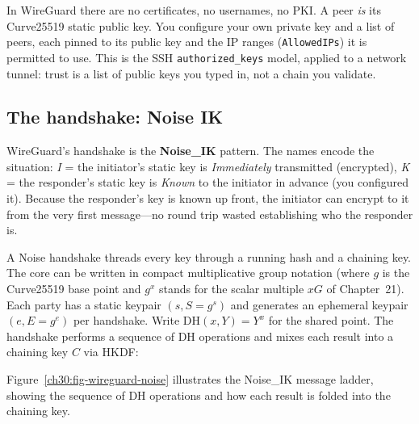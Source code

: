 In WireGuard there are no certificates, no usernames, no PKI. A peer \emph{is} its Curve25519 static public key. You configure your own private key and a list of peers, each pinned to its public key and the IP ranges (\texttt{AllowedIPs}) it is permitted to use. This is the SSH \texttt{authorized\_keys} model, applied to a network tunnel: trust is a list of public keys you typed in, not a chain you validate.

\subsection{The handshake: Noise IK}

WireGuard's handshake is the \textbf{Noise\_IK} pattern. The names encode the situation: \emph{I} = the initiator's static key is \emph{Immediately} transmitted (encrypted), \emph{K} = the responder's static key is \emph{Known} to the initiator in advance (you configured it). Because the responder's key is known up front, the initiator can encrypt to it from the very first message---no round trip wasted establishing who the responder is.

A Noise handshake threads every key through a running hash and a chaining key. The core can be written in compact multiplicative group notation (where \(g\) is the Curve25519 base point and \(g^{x}\) stands for the scalar multiple \(xG\) of Chapter~21). Each party has a static keypair \((s, S=g^{s})\) and generates an ephemeral keypair \((e, E=g^{e})\) per handshake. Write \(\mathrm{DH}(x, Y) = Y^{x}\) for the shared point. The handshake performs a sequence of DH operations and mixes each result into a chaining key \(C\) via HKDF:

Figure~\ref{ch30:fig-wireguard-noise} illustrates the Noise\_IK message ladder, showing the sequence of DH
operations and how each result is folded into the chaining key.


